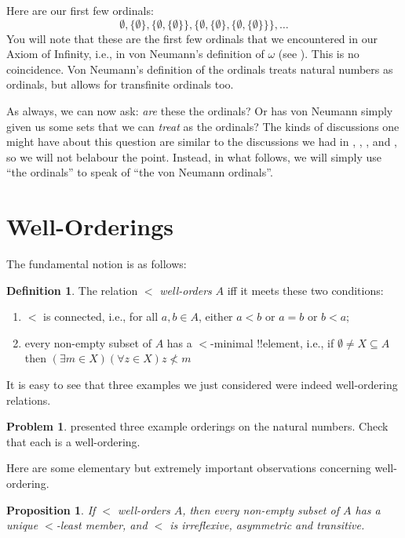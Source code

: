\documentclass[10pt,a4paper]{article}
\makeatletter
\theoremstyle{plain}
\newtheorem{prop}[thm]{Proposition}
\theoremstyle{definition}
\newtheorem{defn}[thm]{Definition}
\newtheorem{prob}{Problem}[section]
\theoremstyle{remark}
\newcommand*{\olfileid}[3]{}
\newcommand*{\olsection}[1]{\section*{#1}}
\newcommand*{\ollabel}[1]{\label{#1}}
\newcommand{\olref}{\@ifnextchar[{\olref@i}{\olref@final}}
\def\olref@i[#1]{\@ifnextchar[{\olref@ii}{\olref@final}}
\def\olref@ii[#1]{\@ifnextchar[{\olref@iii}{\olref@final}}
\def\olref@iii[#1]{\olref@final}
\def\olref@final#1{\ref{#1}}
\makeatother
\begin{document}
Here are our first few ordinals:
\[
	\emptyset, \{\emptyset\}, 
	\{\emptyset, \{\emptyset\}\}, 
	\{\emptyset, \{\emptyset\}, \{\emptyset, \{\emptyset\}\}\}, \ldots
\]
You will note that these are the first few ordinals that we
encountered in our Axiom of Infinity, i.e., in von Neumann's
definition of $\omega$ (see \olref[sth][z][infinity-again]{sec}). This
is no coincidence. Von Neumann's definition of the ordinals treats
natural numbers as ordinals, but allows for transfinite ordinals too. 

As always, we can now ask: \emph{are} these the ordinals? Or has von
Neumann simply given us some sets that we can \emph{treat} as the
ordinals? The kinds of discussions one might have about this question
are similar to the discussions we had in \olref[sfr][rel][ref]{sec},
\olref[sfr][arith][ref]{sec},
\olref[sfr][infinite][dedekindsproof]{sec}, and
\olref[sth][z][nat]{sec}, so we will not belabour the point.
Instead, in what follows, we will simply use ``the ordinals'' to speak
of ``the von Neumann ordinals''. 



\olfileid{sth}{ordinals}{wo}
\olsection{Well-Orderings}

The fundamental notion is as follows:

\begin{defn}
The relation $<$ \emph{well-orders} $A$ iff it meets these two conditions:
\begin{enumerate}
	\item $<$ is connected, i.e., for all $a, b \in A$, either $a < b$
	or $a = b$ or $b < a$;
	\item every non-empty subset of $A$ has a $<$-minimal !!{element},
	i.e., if $\emptyset \neq X \subseteq A$ then $(\exists m \in
	X)(\forall z \in X)z \nless m$
\end{enumerate}
\end{defn}

It is easy to see that three examples we just considered were indeed
well-ordering relations. 

\begin{prob}
 presented three example orderings
on the natural numbers. Check that each is a well-ordering.
\end{prob}

Here are some elementary but extremely important observations
concerning well-ordering.

\begin{prop}\ollabel{wo:strictorder}
If $<$ well-orders $A$, then every non-empty subset of $A$ has a unique
$<$-least member, and $<$ is irreflexive, asymmetric and transitive.
\end{prop}
\end{document}
